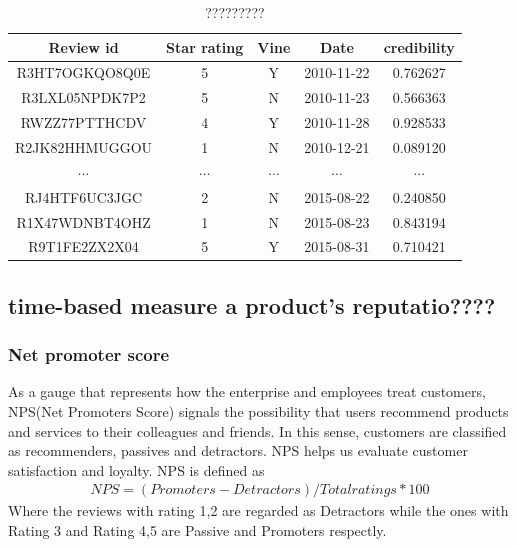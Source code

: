\documentclass[12pt]{article}%
\begin{document}
\begin{table}[H]
	\centering
	\caption{?????????}	
	\begin{tabular}{ccccc}
		\toprule[1.5pt]
		\multicolumn{1}{m{3.5cm}}{\centering Review id} & \multicolumn{1}{m{2cm}}{\centering Star rating}&
		\multicolumn{1}{m{1cm}}{\centering Vine}&
		\multicolumn{1}{m{3cm}}{\centering Date}&
		\multicolumn{1}{m{2.5cm}}{\centering \textbf{credibility}}\\
		\midrule[1pt]
		R3HT7OGKQO8Q0E &5&Y&2010-11-22&0.762627\\
		R3LXL05NPDK7P2 &5&N	&2010-11-23	&0.566363\\
		RWZZ77PTTHCDV &4&Y&2010-11-28&0.928533\\
		R2JK82HHMUGGOU &1&N&2010-12-21&0.089120\\
		$\cdots $&$\cdots $&$\cdots $&$\cdots $&$\cdots $\\
		RJ4HTF6UC3JGC &2&N&2015-08-22&0.240850\\
		R1X47WDNBT4OHZ &1&N&2015-08-23&0.843194\\
		R9T1FE2ZX2X04 &5&Y&2015-08-31&0.710421\\
		\bottomrule[1.6pt]
	\end{tabular}\label{biassssoss}
\end{table}


\subsection{time-based measure a product’s reputatio????}
\subsubsection{Net promoter score}
As a gauge that represents how the enterprise and employees treat customers, NPS(Net Promoters Score) signals the possibility that users recommend products and services to their colleagues and friends. In this sense, customers are classified as recommenders, passives and detractors. NPS helps us evaluate customer satisfaction and loyalty\cite{nsp}. NPS is defined as
\begin{gather}
NPS = (Promoters - Detractors)/Total ratings * 100
\end{gather}
Where the reviews with rating 1,2 are regarded as Detractors while the ones with Rating 3 and Rating 4,5 are Passive and Promoters respectly.
\end{document}
